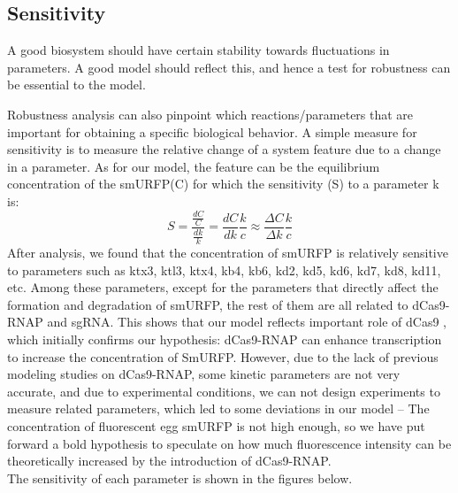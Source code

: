 \subsection{Sensitivity }
A good biosystem should have certain stability towards fluctuations in parameters. A good model should reflect this, and hence a test for robustness can be essential to the model.

Robustness analysis can also pinpoint which reactions/parameters that are important for obtaining a specific biological behavior. A simple measure for sensitivity is to measure the relative change of a system feature due to a change in a parameter. As for our model, the feature can be the equilibrium concentration of the smURFP(C) for which the sensitivity (S) to a parameter k is:
\begin{equation}
	S=\frac{\frac{dC}{C}}{\frac{dk}{k}}=\frac{dC}{dk}\frac{k}{c}\approx \frac{\Delta C}{\Delta k}\frac{k}{c}
\end{equation}
After analysis, we found that the concentration of smURFP is relatively sensitive to parameters such as ktx3, ktl3, ktx4, kb4, kb6, kd2, kd5, kd6, kd7, kd8, kd11, etc. Among these parameters, except for the parameters that directly affect the formation and degradation of smURFP, the rest of them are all related to dCas9-RNAP and sgRNA. This shows that our model reflects  important role of dCas9 , which initially confirms our hypothesis: dCas9-RNAP can enhance transcription to increase the concentration of SmURFP. However, due to the lack of previous modeling studies on dCas9-RNAP, some kinetic parameters are not very accurate, and due to experimental conditions, we can not design experiments to measure related parameters, which led to some deviations in our model -- The concentration of fluorescent egg smURFP is not high enough, so we have put forward a bold hypothesis to speculate on how much fluorescence intensity can be theoretically increased by the introduction of dCas9-RNAP.\\
The sensitivity of each parameter is shown in the figures below.
